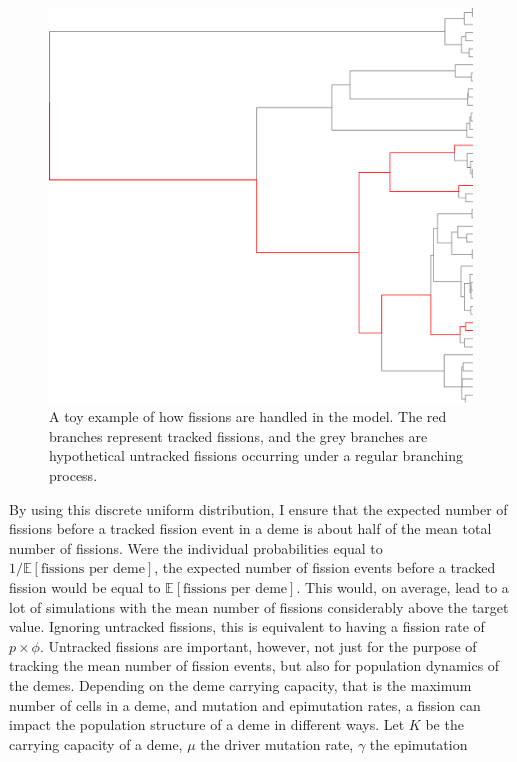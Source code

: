 \begin{figure}[h]
    \centering
    \includegraphics[width=\textwidth]{Chapter_4/figures/example_branching.pdf}
    \caption{A toy example of how fissions are handled in the model. The red
    branches represent tracked fissions, and the grey branches are hypothetical
    untracked fissions occurring under a regular branching process.}
    \label{fig:fission_explainer}
\end{figure}
By using this discrete uniform distribution, I ensure that the expected number
of fissions before a tracked fission event in a deme is about half of the mean
total number of fissions. Were the individual probabilities equal to
$1/\mathbb{E}[\text{fissions per deme}]$, the expected number of fission events
before a tracked fission would be equal to $\mathbb{E}[\text{fissions per
deme}]$. This would, on average, lead to a lot of simulations with the mean
number of fissions considerably above the target value. Ignoring untracked
fissions, this is equivalent to having a fission rate of $p\times\phi$.
Untracked fissions are important, however, not just for the purpose of tracking
the mean number of fission events, but also for population dynamics of the
demes. Depending on the deme carrying capacity, that is the maximum number of
cells in a deme, and mutation and epimutation rates, a fission can impact the
population structure of a deme in different ways. Let $K$ be the carrying
capacity of a deme, $\mu$ the driver mutation rate, $\gamma$ the epimutation
